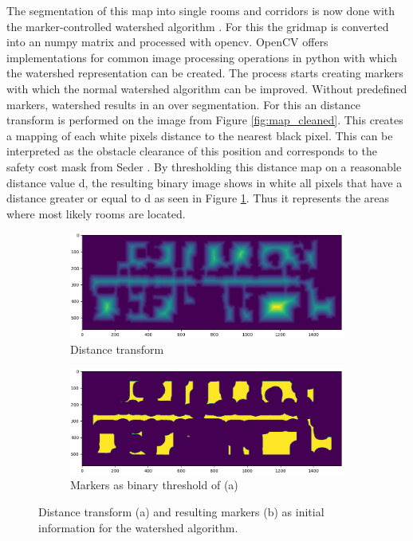 The segmentation of this map into single rooms and corridors is now done with the marker-controlled watershed algorithm \cite{parvati_image_2009}. For this the gridmap is converted into an numpy matrix and processed with opencv. OpenCV offers implementations for common image processing operations in python with which the watershed representation can be created. The process starts creating markers with which the normal watershed algorithm can be improved. Without predefined markers, watershed results in an over segmentation. For this an distance transform is performed on the image from Figure \ref{fig:map_cleaned}. This creates a mapping of each white pixels distance to the nearest black pixel. This can be interpreted as the obstacle clearance of this position and corresponds to the safety cost mask from Seder \cite{seder_hierarchical_2011}. By thresholding this distance map on a reasonable distance value d, the resulting binary image shows in white all pixels that have a distance greater or equal to d as seen in Figure \ref{fig:distance_transform}. Thus it represents the areas where most likely rooms are located. 

\begin{figure}[h]
    \captionsetup[subfigure]{justification=centering}
    \centering
    \begin{subfigure}{.5\textwidth}
      \centering
      \includegraphics[width=\textwidth]{figures/50_implementation/ryu_distance_transform.png}
      \caption{Distance transform}
    \end{subfigure}%
    \begin{subfigure}{.5\textwidth}
      \centering
      \includegraphics[width=\textwidth]{figures/50_implementation/ryu_markers.png}
      \caption{Markers as binary threshold of (a)}
    \end{subfigure}
    \caption[Distance transform and resulting markers]{Distance transform (a) and resulting markers (b) as initial information for the watershed algorithm.}
    \label{fig:distance_transform}
\end{figure}

